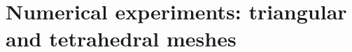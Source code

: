 \documentclass[compress]{beamer}
\theoremstyle{plain}
\renewcommand{\tilde}{\widetilde}
\newcommand{\LRp}[1]{\left( #1 \right)}
\begin{document}
%



\section{Numerical experiments: triangular and tetrahedral meshes}

\end{document}
